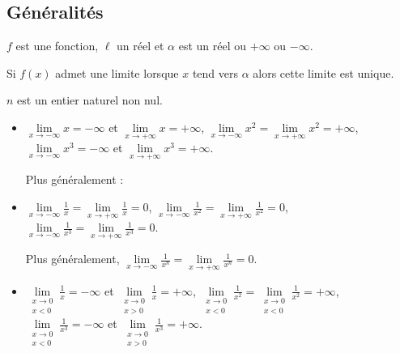     \subsection{Généralités}

\begin{prp}[name={Unicité de la limite}] $f$ est une fonction, $\ell$ un réel et $\alpha$ est un réel ou $+\infty$ ou $-\infty$.

Si $f(x)$ admet une limite lorsque $x$ tend vers $\alpha$ alors cette limite est unique.
\end{prp}

\begin{prp}[name={Limites des fonctions de références}]$n$ est un entier naturel non nul.
\begin{itemize}
\item
    $\lim\limits_{x\to -\infty}x=-\infty$ et $\lim\limits_{x\to +\infty}x=+\infty$, \hfill
    $\lim\limits_{x\to -\infty}x^2=\lim\limits_{x\to +\infty}x^2=+\infty$, \hfill
    $\lim\limits_{x\to -\infty}x^3=-\infty$ et $\lim\limits_{x\to +\infty}x^3=+\infty$.

\medskip

Plus généralement :


\medskip
  
\item
    $\lim\limits_{x\to -\infty}\frac1x=\lim\limits_{x\to +\infty}\frac1x=0$, \hfill
    $\lim\limits_{x\to -\infty}\frac1{x^2}=\lim\limits_{x\to +\infty}\frac1{x^2}=0$, \hfill
    $\lim\limits_{x\to -\infty}\frac1{x^3}=\lim\limits_{x\to +\infty}\frac1{x^3}=0$.

\medskip

 Plus généralement, $\lim\limits_{x\to -\infty}\frac1{x^n}=\lim\limits_{x\to +\infty}\frac1{x^n}=0$.

\medskip

\item
    $\lim\limits_{\substack{x\to 0\\x<0}}\frac1x=-\infty$ et $\lim\limits_{\substack{x\to 0\\x>0}}\frac1x=+\infty$, \hfill
    $\lim\limits_{\substack{x\to 0\\x<0}}\frac1{x^2}=\lim\limits_{\substack{x\to 0\\x<0}}\frac1{x^2}=+\infty$, \hfill
    $\lim\limits_{\substack{x\to 0\\x<0}}\frac1{x^3}=-\infty$ et $\lim\limits_{\substack{x\to 0\\x>0}}\frac1{x^3}=+\infty$.


\end{itemize}
\end{prp}
